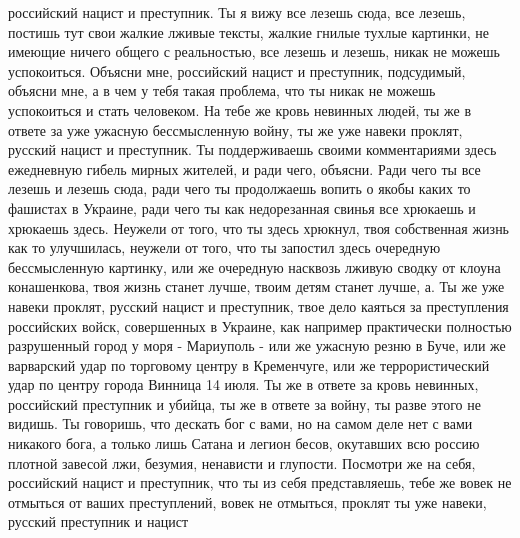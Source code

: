 российский нацист и преступник. Ты я вижу все лезешь сюда, все лезешь, постишь
тут свои жалкие лживые тексты, жалкие гнилые тухлые картинки, не имеющие ничего
общего с реальностью, все лезешь и лезешь, никак не можешь успокоиться. Объясни
мне, российский нацист и преступник, подсудимый, объясни мне, а в чем у тебя
такая проблема, что ты никак не можешь успокоиться и стать человеком. На тебе
же кровь невинных людей, ты же в ответе за уже ужасную бессмысленную войну, ты
же уже навеки проклят, русский нацист и преступник.  Ты поддерживаешь своими
комментариями здесь ежедневную гибель мирных жителей, и ради чего, объясни.
Ради чего ты все лезешь и лезешь сюда, ради чего ты продолжаешь вопить о якобы
каких то фашистах в Украине, ради чего ты как недорезанная свинья все хрюкаешь
и хрюкаешь здесь. Неужели от того, что ты здесь хрюкнул, твоя собственная жизнь
как то улучшилась, неужели от того, что ты запостил здесь очередную
бессмысленную картинку, или же очередную насквозь лживую сводку от клоуна
конашенкова, твоя жизнь станет лучше, твоим детям станет лучше, а. Ты же уже
навеки проклят, русский нацист и преступник, твое дело каяться за преступления
российских войск, совершенных в Украине, как например практически полностью
разрушенный город у моря - Мариуполь - или же ужасную резню в Буче, или же
варварский удар по торговому центру в Кременчуге, или же террористический удар
по центру города Винница 14 июля. Ты же в
ответе за кровь невинных, российский преступник и убийца, ты же в ответе за
войну, ты разве этого не видишь.  Ты говоришь, что дескать бог с вами, но на
самом деле нет с вами никакого бога, а только лишь Сатана и легион бесов,
окутавших всю россию плотной завесой лжи, безумия, ненависти и глупости.
Посмотри же на себя, российский нацист и преступник, что ты из себя
представляешь, тебе же вовек не отмыться от ваших преступлений, вовек не
отмыться, проклят ты уже навеки, русский преступник и нацист

